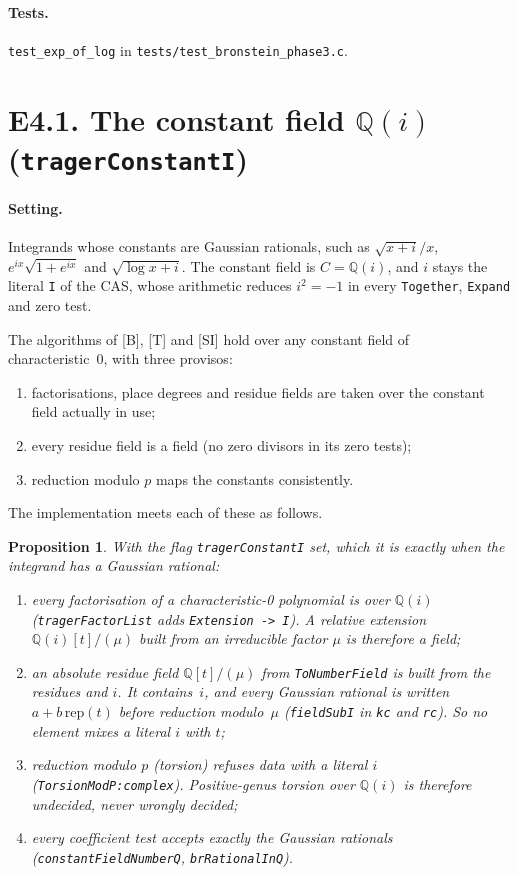 \documentclass[11pt]{article}
\newtheorem{proposition}[theorem]{Proposition}
\theoremstyle{definition}
\theoremstyle{remark}
\newcommand{\Q}{\mathbb{Q}}
\newcommand{\code}[1]{\texttt{#1}}
\begin{document}
\paragraph{Tests.} \code{test\_exp\_of\_log} in
\code{tests/test\_bronstein\_phase3.c}.

\section*{E4.1. The constant field $\Q(i)$ (\code{tragerConstantI})}

\paragraph{Setting.} Integrands whose constants are Gaussian rationals, such as
$\sqrt{x+i}/x$, $e^{ix}\sqrt{1+e^{ix}}$ and $\sqrt{\log x+i}$. The constant
field is $C=\Q(i)$, and $i$ stays the literal \code{I} of the CAS, whose
arithmetic reduces $i^2=-1$ in every \code{Together}, \code{Expand} and zero
test.

The algorithms of [B], [T] and [SI] hold over any constant field of
characteristic~0, with three provisos:
\begin{enumerate}
\item factorisations, place degrees and residue fields are taken over the
  constant field actually in use;
\item every residue field is a field (no zero divisors in its zero tests);
\item reduction modulo $p$ maps the constants consistently.
\end{enumerate}
The implementation meets each of these as follows.

\begin{proposition}\label{prop:E41}
With the flag \code{tragerConstantI} set, which it is exactly when the
integrand has a Gaussian rational:
\begin{enumerate}
\item every factorisation of a characteristic-0 polynomial is over $\Q(i)$
  (\code{tragerFactorList} adds \code{Extension -> I}). A relative extension
  $\Q(i)[t]/(\mu)$ built from an irreducible factor $\mu$ is therefore a field;
\item an absolute residue field $\Q[t]/(\mu)$ from \code{ToNumberField} is built
  from the residues \emph{and} $i$. It contains~$i$, and every Gaussian
  rational is written $a+b\,\mathrm{rep}(t)$ before reduction modulo~$\mu$
  (\code{fieldSubI} in \code{kc} and \code{rc}). So no element mixes a literal
  $i$ with $t$;
\item reduction modulo $p$ (torsion) refuses data with a literal $i$
  (\code{TorsionModP:complex}). Positive-genus torsion over $\Q(i)$ is therefore
  undecided, never wrongly decided;
\item every coefficient test accepts exactly the Gaussian rationals
  (\code{constantFieldNumberQ}, \code{brRationalInQ}).
\end{enumerate}
\end{proposition}
\end{document}
